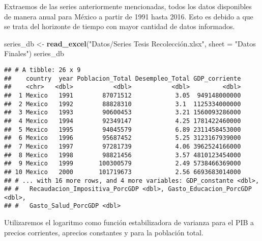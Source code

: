 \documentclass[]{book}
\newenvironment{Shaded}{\begin{snugshade}}{\end{snugshade}}
\newcommand{\KeywordTok}[1]{\textcolor[rgb]{0.13,0.29,0.53}{\textbf{#1}}}
\newcommand{\DataTypeTok}[1]{\textcolor[rgb]{0.13,0.29,0.53}{#1}}
\newcommand{\StringTok}[1]{\textcolor[rgb]{0.31,0.60,0.02}{#1}}
\newcommand{\OperatorTok}[1]{\textcolor[rgb]{0.81,0.36,0.00}{\textbf{#1}}}
\newcommand{\NormalTok}[1]{#1}
\theoremstyle{definition}
\theoremstyle{definition}
\theoremstyle{definition}
\theoremstyle{remark}
\begin{document}
Extraemos de las series anteriormente mencionadas, todos los datos
disponibles de manera anual para México a partir de 1991 hasta 2016.
Esto es debido a que se trata del horizonte de tiempo con mayor cantidad
de datos informados.

\begin{Shaded}
\begin{Highlighting}[]
\NormalTok{series_db <-}\StringTok{ }\KeywordTok{read_excel}\NormalTok{(}\StringTok{"Datos/Series Tesis Recolección.xlsx"}\NormalTok{, }\DataTypeTok{sheet =} \StringTok{"Datos Finales"}\NormalTok{)}
\NormalTok{series_db}
\end{Highlighting}
\end{Shaded}

\begin{verbatim}
## # A tibble: 26 x 9
##    country  year Poblacion_Total Desempleo_Total GDP_corriente
##    <chr>   <dbl>           <dbl>           <dbl>         <dbl>
##  1 Mexico   1991        87071512            3.05  949148000000
##  2 Mexico   1992        88828310            3.1  1125334000000
##  3 Mexico   1993        90600453            3.21 1560093286000
##  4 Mexico   1994        92349147            4.25 1781422460000
##  5 Mexico   1995        94045579            6.89 2311458453000
##  6 Mexico   1996        95687452            5.25 3123167939000
##  7 Mexico   1997        97281739            4.06 3962524166000
##  8 Mexico   1998        98821456            3.57 4810123454000
##  9 Mexico   1999       100300579            2.49 5738466369000
## 10 Mexico   2000       101719673            2.56 6693683014000
## # ... with 16 more rows, and 4 more variables: GDP_constante <dbl>,
## #   Recaudacion_Impositiva_PorcGDP <dbl>, Gasto_Educacion_PorcGDP <dbl>,
## #   Gasto_Salud_PorcGDP <dbl>
\end{verbatim}

Utilizaremos el logaritmo como función estabilizadora de varianza para
el PIB a precios corrientes, aprecios constantes y para la población
total.

\begin{Shaded}
\end{Shaded}
\end{document}
